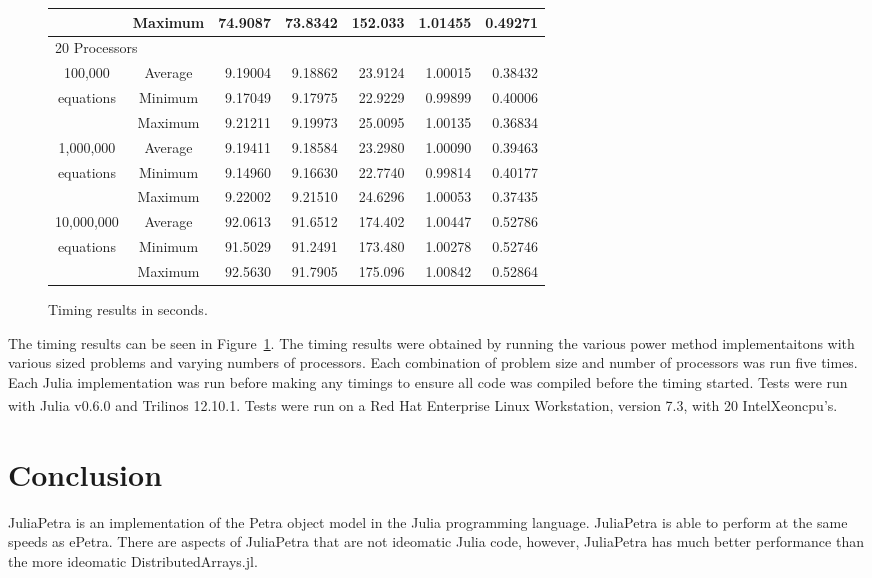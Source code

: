 \documentclass[acmsmall]{acmart}
\let\oldtextregister\textregistered
\renewcommand{\textregistered}{\textsuperscript{\tiny\oldtextregister}}
\begin{document}
\begin{figure}[h]
\begin{tabular}{|c c|r|r|r||r|r|}
						&Maximum & 74.9087 & 73.8342 & 152.033 & 1.01455 & 0.49271 \\
	\hline
			\multicolumn{7}{|l|}{20 Processors}\\
	\hline
		100,000			&Average & 9.19004 & 9.18862 & 23.9124 & 1.00015 & 0.38432 \\
		equations		&Minimum & 9.17049 & 9.17975 & 22.9229 & 0.99899 & 0.40006 \\
						&Maximum & 9.21211 & 9.19973 & 25.0095 & 1.00135 & 0.36834 \\
	\hline
		1,000,000		&Average & 9.19411 & 9.18584 & 23.2980 & 1.00090 & 0.39463 \\
		equations		&Minimum & 9.14960 & 9.16630 & 22.7740 & 0.99814 & 0.40177 \\
						&Maximum & 9.22002 & 9.21510 & 24.6296 & 1.00053 & 0.37435 \\
	\hline
		10,000,000		&Average & 92.0613 & 91.6512 & 174.402 & 1.00447 & 0.52786 \\
		equations		&Minimum & 91.5029 & 91.2491 & 173.480 & 1.00278 & 0.52746 \\
						&Maximum & 92.5630 & 91.7905 & 175.096 & 1.00842 & 0.52864 \\
	\hline
\end{tabular}

\caption{Timing results in seconds.}
\label{fig:timing-results}
\end{figure}

The timing results can be seen in Figure~\ref{fig:timing-results}.
The timing results were obtained by running the various power method implementaitons
with various sized problems and varying numbers of processors.
Each combination of problem size and number of processors was run five times.
Each Julia implementation was run before making any timings to ensure all code was
compiled before the timing started.
Tests were run with Julia v0.6.0 and Trilinos 12.10.1.
Tests were run on a Red Hat Enterprise Linux Workstation, version 7.3,
with 20 Intel\textregistered Xeon\textregistered cpu's.


\section{Conclusion}

JuliaPetra is an implementation of the Petra object model in the Julia programming language.
JuliaPetra is able to perform at the same speeds as ePetra.
There are aspects of JuliaPetra that are not ideomatic Julia code, however, JuliaPetra has much
better performance than the more ideomatic DistributedArrays.jl.



\end{document}
